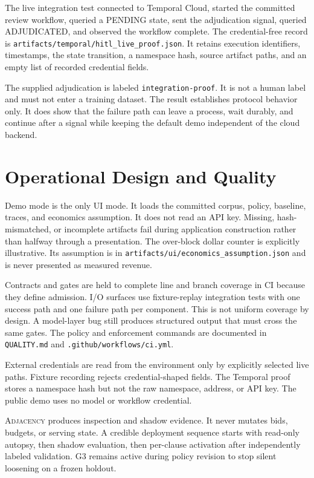 \documentclass{article}
\newcommand{\artifact}[1]{\nolinkurl{#1}}
\newcommand{\code}[1]{\texttt{#1}}
\newcommand{\Adj}{\textsc{Adjacency}\xspace}
\begin{document}
The live integration test connected to Temporal Cloud, started the committed review workflow,
queried a PENDING state, sent the adjudication signal, queried ADJUDICATED, and observed the workflow
complete. The credential-free record is
\artifact{artifacts/temporal/hitl_live_proof.json}. It retains execution identifiers, timestamps,
the state transition, a namespace hash, source artifact paths, and an empty list of recorded
credential fields.

The supplied adjudication is labeled \code{integration-proof}. It is not a human label and must not
enter a training dataset. The result establishes protocol behavior only. It does show that the
failure path can leave a process, wait durably, and continue after a signal while keeping the default
demo independent of the cloud backend.

\section{Operational Design and Quality}
\label{sec:quality}

 Demo mode is the only UI mode. It loads the committed corpus,
policy, baseline, traces, and economics assumption. It does not read an API key. Missing,
hash-mismatched, or incomplete artifacts fail during application construction rather than halfway
through a presentation. The over-block dollar counter is explicitly illustrative. Its assumption is
in \artifact{artifacts/ui/economics_assumption.json} and is never presented as measured revenue.

 Contracts and gates are held to complete line and branch coverage in CI
because they define admission. I/O surfaces use fixture-replay integration tests with one success
path and one failure path per component. This is not uniform coverage by design. A model-layer bug
still produces structured output that must cross the same gates. The policy and enforcement commands
are documented in \artifact{QUALITY.md} and \artifact{.github/workflows/ci.yml}.

 External credentials are read from the environment only by explicitly
selected live paths. Fixture recording rejects credential-shaped fields. The Temporal proof stores a
namespace hash but not the raw namespace, address, or API key. The public demo uses no model or
workflow credential.

 \Adj produces inspection and shadow evidence. It never mutates bids,
budgets, or serving state. A credible deployment sequence starts with read-only autopsy, then shadow
evaluation, then per-clause activation after independently labeled validation. G3 remains active
during policy revision to stop silent loosening on a frozen holdout.
\end{document}
